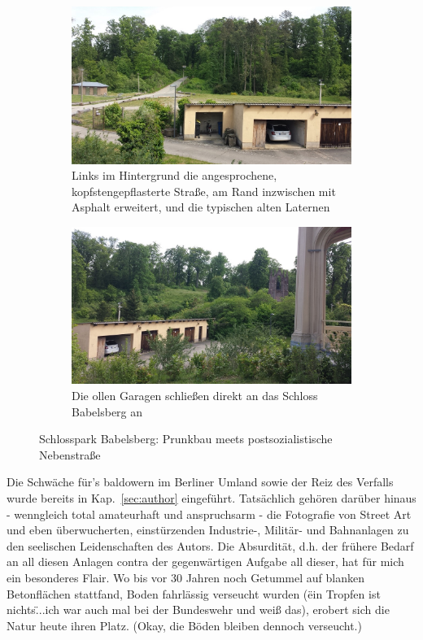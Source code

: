 \begin{figure}[h]
\centering
	\begin{subfigure}[b]{0.49\textwidth}
    \includegraphics[width=1.0\textwidth]{img/inspiration/babelsberg_ambivalent_1.jpg}
   \caption{Links im Hintergrund die angesprochene, kopfstengepflasterte Stra{\ss}e, am Rand inzwischen mit Asphalt erweitert, und die typischen alten Laternen}
    \label{img:inspiration_babelsberg_ambivalent_1}
    \end{subfigure}
	\begin{subfigure}[b]{0.49\textwidth}
    \includegraphics[width=1.0\textwidth]{img/inspiration/babelsberg_ambivalent_2.jpg}
   \caption{Die ollen Garagen schlie{\ss}en direkt an das Schloss Babelsberg an}
    \label{img:inspiration_babelsberg_ambivalent_2}
    \end{subfigure}
	\caption{Schlosspark Babelsberg: Prunkbau meets postsozialistische Nebenstra{\ss}e}
	\label{img:inspiration_babelsberg_ambivalent}
\end{figure}

Die Schw\"ache f\"ur's baldowern im Berliner Umland sowie der Reiz des Verfalls wurde bereits in Kap.~\ref{sec:author} eingef\"uhrt.
Tats\"achlich geh\"oren dar\"uber hinaus - wenngleich total amateurhaft und anspruchsarm - die Fotografie von Street Art und eben \"uberwucherten, einst\"urzenden Industrie-, Milit\"ar- und Bahnanlagen zu den seelischen Leidenschaften des Autors.
Die Absurdit\"at, d.h. der fr\"uhere Bedarf an all diesen Anlagen contra der gegenw\"artigen Aufgabe all dieser, hat f\"ur mich ein besonderes Flair.
Wo bis vor 30 Jahren noch Getummel auf blanken Betonfl\"achen stattfand, Boden fahrl\"assig verseucht wurden (\"ein Tropfen ist nichts\" ...ich war auch mal bei der Bundeswehr und wei{\ss} das), erobert sich die Natur heute ihren Platz.
(Okay, die B\"oden bleiben dennoch verseucht.)

